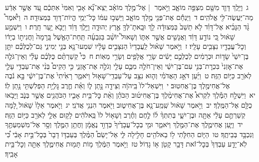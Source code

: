 \documentclass[18pt]{article}
\newcommand{\kri}[1]{\Afootnote{#1}}	%
\begin{document}
 {\loc ג~}וַיֵּ֧לֶךְ דָּוִ֛ד מִשָּׁ֖ם מִצְפֵּ֣ה מוֹאָ֑ב וַיֹּ֣אמֶר  |  אֶל־מֶ֣לֶךְ מוֹאָ֗ב יֵֽצֵא־נָ֞א אָבִ֤י וְאִמִּי֙ אִתְּכֶ֔ם עַ֚ד אֲשֶׁ֣ר אֵדַ֔ע מַה־יַּעֲשֶׂה־לִּ֖י אֱלֹהִֽים׃ \startlock
 {\loc ד~}וַיַּנְחֵ֕ם אֶת־פְּנֵ֖י מֶ֣לֶךְ מוֹאָ֑ב וַיֵּשְׁב֣וּ עִמּ֔וֹ כׇּל־יְמֵ֥י הֱיוֹת־דָּוִ֖ד בַּמְּצוּדָֽה׃ \startlock
 {\loc ה~}וַיֹּ֩אמֶר֩ גָּ֨ד הַנָּבִ֜יא אֶל־דָּוִ֗ד לֹ֤א תֵשֵׁב֙ בַּמְּצוּדָ֔ה לֵ֥ךְ וּבָֽאתָ־לְּךָ֖ אֶ֣רֶץ יְהוּדָ֑ה וַיֵּ֣לֶךְ דָּוִ֔ד וַיָּבֹ֖א יַ֥עַר חָֽרֶת׃ \startlock
 {\loc ו~}וַיִּשְׁמַ֣ע שָׁא֔וּל כִּ֚י נוֹדַ֣ע דָּוִ֔ד וַאֲנָשִׁ֖ים אֲשֶׁ֣ר אִתּ֑וֹ וְשָׁאוּל֩ יוֹשֵׁ֨ב בַּגִּבְעָ֜ה תַּֽחַת־הָאֶ֤שֶׁל בָּֽרָמָה֙ וַחֲנִית֣וֹ בְיָד֔וֹ וְכׇל־עֲבָדָ֖יו נִצָּבִ֥ים עָלָֽיו׃ \startlock
 {\loc ז~}וַיֹּ֣אמֶר שָׁא֗וּל לַֽעֲבָדָיו֙ הַנִּצָּבִ֣ים עָלָ֔יו שִׁמְעוּ־נָ֖א בְּנֵ֣י יְמִינִ֑י גַּם־לְכֻלְּכֶ֗ם יִתֵּ֤ן בֶּן־יִשַׁי֙ שָׂד֣וֹת וּכְרָמִ֔ים לְכֻלְּכֶ֣ם יָשִׂ֔ים שָׂרֵ֥י אֲלָפִ֖ים וְשָׂרֵ֥י מֵאֽוֹת׃ \startlock
 {\loc ח~}כִּי֩ קְשַׁרְתֶּ֨ם כֻּלְּכֶ֜ם עָלַ֗י וְאֵין־גֹּלֶ֤ה אֶת־אׇזְנִי֙ בִּכְרׇת־בְּנִ֣י עִם־בֶּן־יִשַׁ֔י וְאֵין־חֹלֶ֥ה מִכֶּ֛ם עָלַ֖י וְגֹלֶ֣ה אֶת־אׇזְנִ֑י כִּ֣י הֵקִים֩ בְּנִ֨י אֶת־עַבְדִּ֥י עָלַ֛י לְאֹרֵ֖ב כַּיּ֥וֹם הַזֶּֽה׃ \startlock
 {\loc ט~}וַיַּ֜עַן דֹּאֵ֣ג הָאֲדֹמִ֗י וְה֛וּא נִצָּ֥ב עַל־עַבְדֵֽי־שָׁא֖וּל וַיֹּאמַ֑ר רָאִ֙יתִי֙ אֶת־בֶּן־יִשַׁ֔י בָּ֣א נֹ֔בֶה אֶל־אֲחִימֶ֖לֶךְ בֶּן־אֲחִטֽוּב׃ \startlock
 {\loc י~}וַיִּשְׁאַל־לוֹ֙ בַּֽיהֹוָ֔ה וְצֵידָ֖ה נָ֣תַן ל֑וֹ וְאֵ֗ת חֶ֛רֶב גׇּלְיָ֥ת הַפְּלִשְׁתִּ֖י נָ֥תַן לֽוֹ׃ \startlock
 {\loc יא~}וַיִּשְׁלַ֣ח הַמֶּ֡לֶךְ לִקְרֹא֩ אֶת־אֲחִימֶ֨לֶךְ בֶּן־אֲחִיט֜וּב הַכֹּהֵ֗ן וְאֵ֨ת כׇּל־בֵּ֥ית אָבִ֛יו הַכֹּהֲנִ֖ים אֲשֶׁ֣ר בְּנֹ֑ב וַיָּבֹ֥אוּ כֻלָּ֖ם אֶל־הַמֶּֽלֶךְ׃ \startlock
 {\loc יב~}וַיֹּ֣אמֶר שָׁא֔וּל שְֽׁמַֽע־נָ֖א בֶּן־אֲחִיט֑וּב וַיֹּ֖אמֶר הִנְנִ֥י אֲדֹנִֽי׃ \startlock
 {\loc יג~}וַיֹּ֤אמֶר אֵלָו֙ שָׁא֔וּל לָ֚מָּה קְשַׁרְתֶּ֣ם עָלַ֔י אַתָּ֖ה וּבֶן־יִשָׁ֑י בְּתִתְּךָ֨ ל֜וֹ לֶ֣חֶם וְחֶ֗רֶב וְשָׁא֥וֹל לוֹ֙ בֵּֽאלֹהִ֔ים לָק֥וּם אֵלַ֛י לְאֹרֵ֖ב כַּיּ֥וֹם הַזֶּֽה׃ \startlock
 {\loc יד~}וַיַּ֧עַן אֲחִימֶ֛לֶךְ אֶת־הַמֶּ֖לֶךְ וַיֹּאמַ֑ר וּמִ֤י בְכׇל־עֲבָדֶ֙יךָ֙ כְּדָוִ֣ד נֶאֱמָ֔ן וַחֲתַ֥ן הַמֶּ֛לֶךְ וְסָ֥ר אֶל־מִשְׁמַעְתֶּ֖ךָ וְנִכְבָּ֥ד בְּבֵיתֶֽךָ׃ \startlock
 {\loc טו~}הַיּ֧וֹם הַחִלֹּ֛תִי  \edtext{(לשאול)}{\kri{קרי: לִשְׁאׇל־}} ל֥וֹ בֵאלֹהִ֖ים חָלִ֣ילָה לִּ֑י אַל־יָשֵׂם֩ הַמֶּ֨לֶךְ בְּעַבְדּ֤וֹ דָבָר֙ בְּכׇל־בֵּ֣ית אָבִ֔י כִּ֠י לֹֽא־יָדַ֤ע עַבְדְּךָ֙ בְּכׇל־זֹ֔את דָּבָ֥ר קָטֹ֖ן א֥וֹ גָדֽוֹל׃ \startlock
 {\loc טז~}וַיֹּ֣אמֶר הַמֶּ֔לֶךְ מ֥וֹת תָּמ֖וּת אֲחִימֶ֑לֶךְ אַתָּ֖ה וְכׇל־בֵּ֥ית אָבִֽיךָ׃ \startlock
\end{document}
